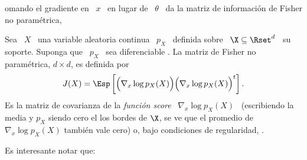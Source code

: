 omando el  gradiente en \  $x$ \ en  lugar de \ $\theta$  \ da la  matriz de
informaci\'on de Fisher no param\'etrica,
%
\begin{definicion}
  Sea \ $X$ \ una  variable aleatoria continua   \  $p_X$ \  definida  sobre \  $\X  \subseteq  \Rset^d$ \  su
  soporte.  Suponga que \ $p_X$ \ sea diferenciable .
  La matriz de Fisher no param\'etrica, $d \times d$, es definida por
  \[
  J(X) =  \Esp\left[ \Big(  \nabla_x \log p_X(X)  \Big) \Big(  \nabla_x \log
      p_X(X) \Big)^t \right].
  \]
  Es  la matriz  de covarianza  de  la {\it  funci\'on score}  \ $\nabla_x  \log
  p_X(X)$ \ (escribiendo la media y $p_X$  siendo cero el los bordes de $\X$, se
  ve que  el promedio  de $\nabla_x  \log p_X(X)$ tambi\'en  vale cero)  o, bajo
  condiciones   de    regularidad,   .
\end{definicion}
%
Es interesante notar que:
%
